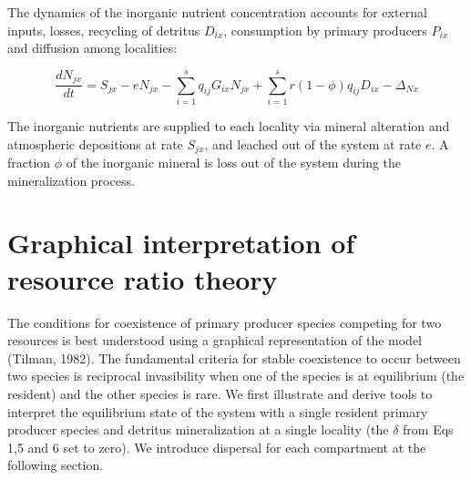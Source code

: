 \documentclass[letterpaper,twocolumn,showkeys]{revtex4-1}
\begin{document}
The dynamics of the inorganic nutrient concentration accounts for external inputs, losses, recycling of detritus $D_{ix}$, consumption by primary producers $P_{ix}$ and diffusion among localities: 

\begin{equation}
	\label{e:bnet}
	\frac{dN_{jx}}{dt}=S_{jx}-eN_{jx}-\sum_{i=1}^{s}q_{ij}G_{ix}N_{jx}+\sum_{i=1}^{s}r(1-\phi)q_{ij}D_{ix}-\Delta_{Nx}
\end{equation}

The inorganic nutrients are supplied to each locality via mineral alteration and atmospheric depositions at rate $S_{jx}$, and leached out of the system at rate $e$. A fraction $\phi$ of the inorganic mineral is loss out of the system during the mineralization process.

\section{Graphical interpretation of resource ratio theory}

The conditions for coexistence of primary producer species competing for two resources is best understood using a graphical representation of the model (Tilman, 1982). The fundamental criteria for stable coexistence to occur between two species is reciprocal invasibility when one of the species is at equilibrium (the resident) and the other species is rare. We first illustrate and derive tools to interpret the equilibrium state of the system with a single resident primary producer species and detritus mineralization at a single locality (the $\delta$ from Eqs 1,5 and 6 set to zero). We introduce dispersal for each compartment at the following section. 
\end{document}
